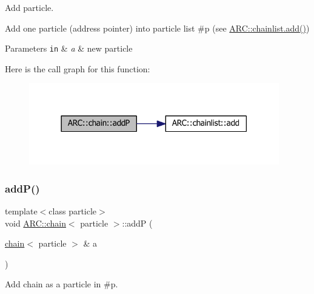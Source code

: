 Add particle. 

Add one particle (address pointer) into particle list \#p (see \hyperlink{classARC_1_1chainlist_afa780edfa301cc22cf189e63d7a59c2c}{A\+R\+C\+::chainlist.\+add()}) 
\begin{DoxyParams}[1]{Parameters}
\mbox{\tt in}  & {\em a} & new particle \\
\hline
\end{DoxyParams}
Here is the call graph for this function\+:
\nopagebreak
\begin{figure}[H]
\begin{center}
\leavevmode
\includegraphics[width=309pt]{classARC_1_1chain_a0f91c399beb1e5c0db6ed7e2b4d00477_cgraph}
\end{center}
\end{figure}
\hypertarget{classARC_1_1chain_a22a0c3e8b42954edee0d2f66a27e8640}{}\label{classARC_1_1chain_a22a0c3e8b42954edee0d2f66a27e8640} 
\subsubsection{\texorpdfstring{add\+P()}{addP()}\hspace{0.1cm}{\footnotesize\ttfamily [2/3]}}
{\footnotesize\ttfamily template$<$class particle$>$ \\
void \hyperlink{classARC_1_1chain}{A\+R\+C\+::chain}$<$ particle $>$\+::addP (\begin{DoxyParamCaption}\item[{\hyperlink{classARC_1_1chain}{chain}$<$ particle $>$ \&}]{a }\end{DoxyParamCaption})\hspace{0.3cm}{\ttfamily [inline]}}



Add chain as a particle in \#p. 

